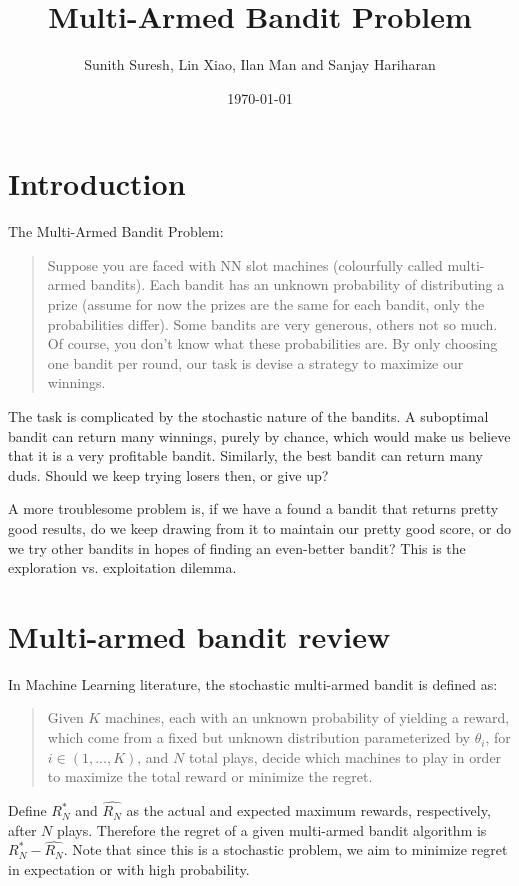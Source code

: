 \documentclass{article}
\title{Multi-Armed Bandit Problem}
\author{Sunith Suresh, Lin Xiao, Ilan Man and Sanjay Hariharan}
\date{\today}
\begin{document}
\maketitle

\section{Introduction}

The Multi-Armed Bandit Problem:

\begin{quote}
Suppose you are faced with NN slot machines (colourfully called multi-armed bandits). Each bandit has an unknown probability of distributing a prize (assume for now the prizes are the same for each bandit, only the probabilities differ). Some bandits are very generous, others not so much. Of course, you don't know what these probabilities are. By only choosing one bandit per round, our task is devise a strategy to maximize our winnings.
\end{quote}

The task is complicated by the stochastic nature of the bandits. A suboptimal bandit can return many winnings, purely by chance, which would make us believe that it is a very profitable bandit. Similarly, the best bandit can return many duds. Should we keep trying losers then, or give up?

A more troublesome problem is, if we have a found a bandit that returns pretty good results, do we keep drawing from it to maintain our pretty good score, or do we try other bandits in hopes of finding an even-better bandit? This is the exploration vs. exploitation dilemma.

\section{Multi-armed bandit review}

In Machine Learning literature, the stochastic multi-armed bandit is defined as: 

\begin{quote}
Given $K$ machines, each with an unknown probability of yielding a reward, which come from a fixed but unknown distribution parameterized by $\theta_i$, for $i \in (1, ..., K)$, and $N$ total plays, decide which machines to play in order to maximize the total reward or minimize the regret.
\end{quote}

Define $R_{N}^{*}$ and $\hat{R_{N}}$ as the actual and expected maximum rewards, respectively, after $N$ plays. Therefore the regret of a given multi-armed bandit algorithm is $R_{N}^{*} - \hat{R_{N}}$. Note that since this is a stochastic problem, we aim to minimize regret in expectation or with high probability.\\
\end{document}
